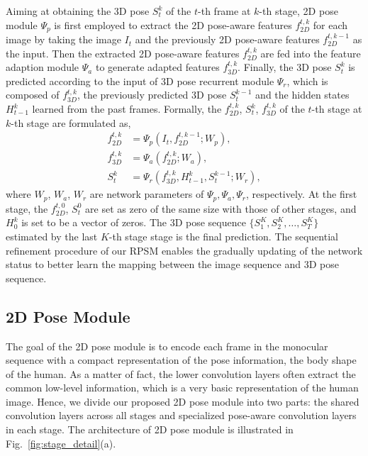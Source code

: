 \documentclass[10pt,twocolumn,letterpaper]{article}
\begin{document}
Aiming at obtaining the 3D pose $S_t^k$ of the $t$-th frame at $k$-th stage, 2D pose module $\Psi_p$ is first employed to extract the 2D pose-aware features $f_{2D}^{t,k}$ for each image by taking the image $I_t$ and the previously 2D pose-aware features $f_{2D}^{t,k-1}$ as the input. Then the extracted 2D pose-aware features $f_{2D}^{t,k}$ are fed into the feature adaption module $\Psi_a$ to generate adapted features $f_{3D}^{t,k}$. Finally, the 3D pose $S_t^{k}$ is predicted according to the input of 3D pose recurrent module $\Psi_r$, which is composed of $f_{3D}^{t,k}$, the previously predicted 3D pose $S_t^{k-1}$ and the hidden states $H_{t-1}^k$ learned from the past frames. Formally, the $f_{2D}^{t,k} $, $S_t^k$, $f_{3D}^{t,k}$ of the $t$-th stage at $k$-th stage are formulated as, 
\begin{equation}
	\begin{aligned}
	f_{2D}^{t,k} &= \Psi_p(I_t,f_{2D}^{t,k-1}; W_p), \\
	f_{3D}^{t,k} &= \Psi_a(f_{2D}^{t,k}; W_a), \\
	S_t^k &= \Psi_r(f_{3D}^{t,k}, H_{t-1}^k,S_t^{k-1}; W_r),
	\label{eq:opt}
	\end{aligned}	
\end{equation}
where $W_p$, $W_a$, $W_r$ are network parameters of $\Psi_p, \Psi_a, \Psi_r$, respectively. At the first stage, the $f_{2D}^{t,0}$, $S_t^0$ are set as zero of the same size with those of other stages, and $H_0^k$ is set to be a vector of zeros. The 3D pose sequence $\{S_1^K,S_2^K,\dots,S_T^K\}$ estimated by the last $K$-th stage stage is the final prediction. The sequential refinement procedure of our RPSM enables the gradually updating of the network status to better learn the mapping between the image sequence and 3D pose sequence.

\subsection{2D Pose Module}
\label{sec:2d_pose_cnn}
The goal of the 2D pose module is to encode each frame in the monocular sequence with a compact representation of the pose information, \eg the body shape of the human. As a matter of fact, the lower convolution layers often extract the common low-level information, which is a very basic representation of the human image. Hence, we divide our proposed 2D pose module into two parts: the shared convolution layers across all stages and specialized pose-aware convolution layers in each stage. The architecture of 2D pose module is illustrated in Fig.~\ref{fig:stage_detail}(a). 
\end{document}
